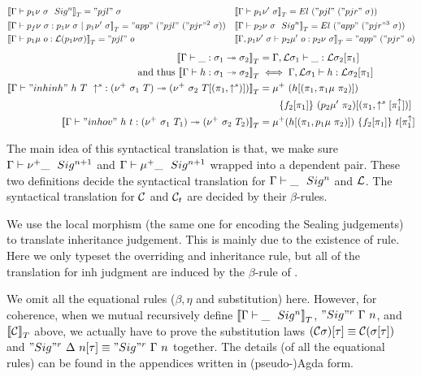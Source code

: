 \begin{align*}
  &{{\llbracket {{ {\Gamma} \vdash {p_1\nu~\sigma} \ \ Sig^{n} }} \rrbracket}_T} = "pjl"~\sigma 
  &&{{\llbracket {{ {\Gamma} \vdash {p_1\nu'~\sigma} }} \rrbracket}_T} = El~("pjl"~("pjr"~\sigma)) \\
  &{{\llbracket {{ {\Gamma} \vdash {p_f\nu~\sigma} : {p_1\nu~\sigma} \ |\ {p_1\nu'~\sigma} }} \rrbracket}_T} = "app"~("pjl"~("pjr"^2~\sigma)) 
  &&{{\llbracket {{ {\Gamma} \vdash {p_2\nu~\sigma} \ \ Sig^{n} }} \rrbracket}_T} = El~("app"~("pjr"^3~\sigma)) \\ 
  &{{\llbracket {{ {\Gamma} \vdash {p_1\mu~o} : {{\mathcal{L}}(p_1\nu\sigma)} }} \rrbracket}_T} = "pjl"~o 
  &&{{\llbracket {{ {\Gamma, p_1\nu'~\sigma} \vdash {p_2\mu'~o} : {p_2\nu~\sigma} }} \rrbracket}_T} = "app"~("pjr"~o)
\end{align*}
\begin{align*}
  {{\llbracket {{ {\Gamma} \vdash {\_} : {\sigma_1} \twoheadrightarrow {\sigma_2}}} \rrbracket}_T} &= { {\Gamma, {\mathcal{L}}\sigma_1} \vdash {\_} : {{\mathcal{L}}\sigma_2[\pi_1]} } \\ \text{ and thus } {{\llbracket {{ {\Gamma} \vdash {h} : {\sigma_1} \twoheadrightarrow {\sigma_2}}} \rrbracket}_T} &\iff  { {\Gamma, {\mathcal{L}}\sigma_1} \vdash {h} : {{\mathcal{L}}\sigma_2[\pi_1]} } \\
  {{\llbracket {{ {\Gamma} \vdash {"inhinh"~h~T~\uparrow^s} : {(\nu^+ \  \sigma_1 \  T)} \twoheadrightarrow {(\nu^+ \  \sigma_2 \  T[(\pi_1, \uparrow^s)])}}} \rrbracket}_T} &= \mu^+~(h[(\pi_1,\pi_1\mu~\pi_2)])\\ &\quad \quad \{f_2[\pi_1]\}~(p_2\mu'~\pi_2)[(\pi_1, \uparrow^s[\pi_1^{\uparrow}])] \\
  {{\llbracket {{ {\Gamma} \vdash {"inhov"~h~t} : {(\nu^+ \  \sigma_1 \  T_1)} \twoheadrightarrow {(\nu^+ \  \sigma_2\  T_2)}}} \rrbracket}_T} &= \mu^+ (h[(\pi_1, p_1\mu~\pi_2)])~\{f_2[\pi_1]\}~t[\pi_1^{\uparrow}]
\end{align*}

The main idea of this syntactical translation is that, we make sure ${ {\Gamma} \vdash {\nu^+ \_ } \ \ Sig^{n+1} }$ and ${ {\Gamma} \vdash {\mu^+ \_} \ \ Sig^{n+1} }$ wrapped into a dependent pair. These two definitions decide the syntactical translation for ${ {\Gamma} \vdash {\_} \ \ Sig^{n} }$ and ${\mathcal{L}}$. The syntactical translation for ${\mathcal{C}}$ and ${\mathcal{C}_t}$ are decided by their $\beta$-rules. 

We use the local morphism (the same one for encoding the Sealing judgements) to translate inheritance judgement. This is mainly due to the existence of  rule. Here we only typeset the overriding and inheritance rule, but all of the translation for inh judgment are induced by the $\beta$-rule of .

We omit all the equational rules ($\beta,\eta$ and substitution) here. However, for coherence, when we mutual recursively define ${{\llbracket {{ {\Gamma} \vdash {\_} \ \ Sig^{n} }} \rrbracket}_T}$, ${{ "Sig"^r~{\Gamma}~{n} }} $, and ${{\llbracket {{\mathcal{C}}} \rrbracket}_T}$ above, we actually have to prove the substitution laws $({\mathcal{C}}\sigma)[\tau]\equiv {\mathcal{C}}(\sigma[\tau])$ and ${ "Sig"^r~{\Delta}~{n} }[\tau] \equiv { "Sig"^r~{\Gamma}~{n} }$ together. The details (of all the equational rules) can be found in the appendices written in (pseudo-)Agda form. 


